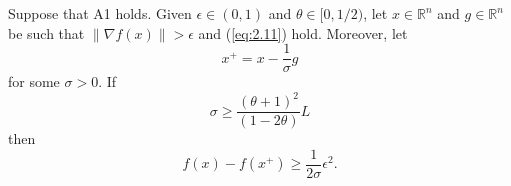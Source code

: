 \begin{lemma}
\label{lem:2.3}
Suppose that A1 holds. Given $\epsilon\in (0,1)$ and $\theta\in [0,1/2)$, let $x\in\mathbb{R}^{n}$ and $g\in\mathbb{R}^{n}$ be such that $\|\nabla f(x)\|>\epsilon$ and (\ref{eq:2.11}) hold. Moreover, let 
\begin{equation*}
x^{+}=x-\frac{1}{\sigma}g
\end{equation*}
for some $\sigma>0$. If 
\begin{equation}
\sigma\geq\dfrac{(\theta +1)^{2}}{(1-2\theta)}L
\label{eq:2.12}
\end{equation}
then
\begin{equation}
f(x)-f(x^{+})\geq\dfrac{1}{2\sigma}\epsilon^{2}.
\label{eq:2.13}
\end{equation}
\end{lemma}

